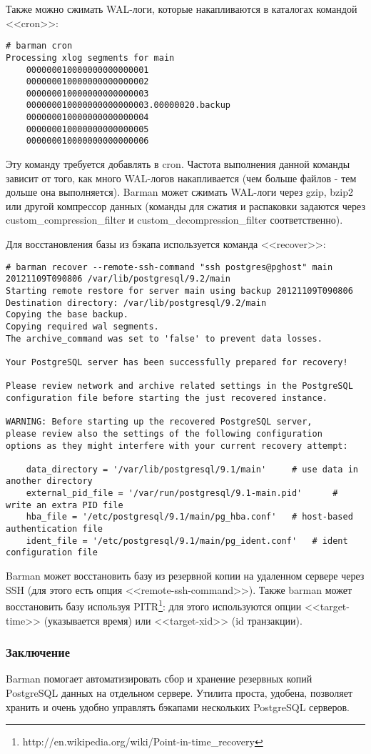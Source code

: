 Также можно сжимать WAL-логи, которые накапливаются в каталогах командой <<cron>>:

\begin{lstlisting}[label=lst:barman16,caption=Архивирование WAL-логов]
# barman cron
Processing xlog segments for main
	000000010000000000000001
	000000010000000000000002
	000000010000000000000003
	000000010000000000000003.00000020.backup
	000000010000000000000004
	000000010000000000000005
	000000010000000000000006
\end{lstlisting}

Эту команду требуется добавлять в cron. Частота выполнения данной команды зависит от того, как много WAL-логов накапливается (чем больше файлов - тем дольше она выполняется). Barman может сжимать WAL-логи через gzip, bzip2 или другой компрессор данных (команды для сжатия и распаковки задаются через custom\_compression\_filter и custom\_decompression\_filter соответственно).

Для восстановления базы из бэкапа используется команда <<recover>>:

\begin{lstlisting}[label=lst:barman17,caption=Восстановление базы]
# barman recover --remote-ssh-command "ssh postgres@pghost" main 20121109T090806 /var/lib/postgresql/9.2/main
Starting remote restore for server main using backup 20121109T090806 
Destination directory: /var/lib/postgresql/9.2/main
Copying the base backup.
Copying required wal segments.
The archive_command was set to 'false' to prevent data losses.

Your PostgreSQL server has been successfully prepared for recovery!

Please review network and archive related settings in the PostgreSQL
configuration file before starting the just recovered instance.

WARNING: Before starting up the recovered PostgreSQL server,
please review also the settings of the following configuration
options as they might interfere with your current recovery attempt:

    data_directory = '/var/lib/postgresql/9.1/main'		# use data in another directory
    external_pid_file = '/var/run/postgresql/9.1-main.pid'		# write an extra PID file
    hba_file = '/etc/postgresql/9.1/main/pg_hba.conf'	# host-based authentication file
    ident_file = '/etc/postgresql/9.1/main/pg_ident.conf'	# ident configuration file
\end{lstlisting}

Barman может восстановить базу из резервной копии на удаленном сервере через SSH (для этого есть опция <<remote-ssh-command>>). Также barman может восстановить базу используя PITR\footnote{http://en.wikipedia.org/wiki/Point-in-time\_recovery}: для этого используются опции <<target-time>> (указывается время) или <<target-xid>> (id транзакции).

\subsubsection{Заключение}
Barman помогает автоматизировать сбор и хранение резервных копий PostgreSQL данных на отдельном сервере. Утилита проста, удобена, позволяет хранить и очень удобно управлять бэкапами нескольких PostgreSQL серверов.